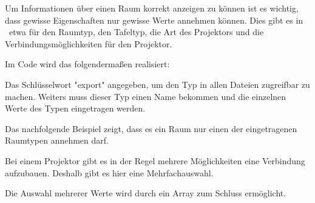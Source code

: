 \label{sec:roomtype}

Um Informationen über einen Raum korrekt anzeigen zu können ist es wichtig, dass gewisse Eigenschaften nur gewisse Werte annehmen können. Dies gibt es in \ZELIA\ etwa für den Raumtyp, den Tafeltyp, die Art des Projektors und die Verbindungsmöglichkeiten für den Projektor.

Im Code wird das folgendermaßen realisiert:

Das Schlüsselwort "export" angegeben, um den Typ in allen Dateien zugreifbar zu machen. Weiters muss dieser Typ einen Name bekommen und die einzelnen Werte des Typen eingetragen werden. 

Das nachfolgende Beispiel zeigt, dass es ein Raum nur einen der eingetragenen Raumtypen annehmen darf.


Bei einem Projektor gibt es in der Regel mehrere Möglichkeiten eine Verbindung aufzubauen. Deshalb gibt es hier eine Mehrfachauswahl.

Die Auswahl mehrerer Werte wird durch ein Array zum Schluss ermöglicht.

